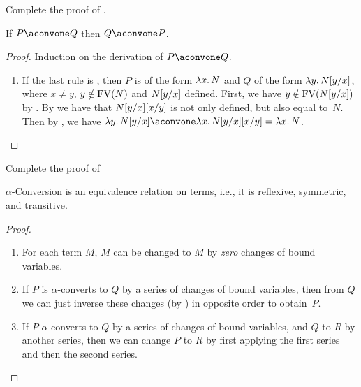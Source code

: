 \documentclass[../../../include/open-logic-section]{subfiles}
\begin{document}
\begin{prob}
  Complete the proof of .
\end{prob}

\begin{lem}
  If $P \aconvone Q$ then $Q \aconvone P$.
\end{lem}

\begin{proof}
  Induction on the derivation of $P \aconvone Q$.
  \begin{enumerate}
  \item If the last rule is , then $P$ is of the
    form $\lambd[x][N]$ and $Q$ of the form
    $\lambd[y][\Subst{N}{y}{x}]$, where $x \neq y$, $y \notin \mathrm{FV}({N})$
    and $N[y/x]$ defined. First, we have $y \notin
    \mathrm{FV}({N[y/x]})$ by . By
     we have that $N[y/x][x/y]$ is
    not only defined, but also equal to~$N$. Then by
    , we have $\lambd[y][\Subst{N}{y}{x}]
    \aconvone \lambd[x][\Subst{\Subst{N}{y}{x}}{x}{y}] =
    \lambd[x][N]$.
  \end{enumerate}
\end{proof}

\begin{prob}
  Complete the proof of 
\end{prob}

\begin{thm}
  $\alpha$-Conversion is an equivalence relation on terms, i.e., it is
  reflexive, symmetric, and transitive.
\end{thm}

\begin{proof}
  \begin{enumerate}
  \item For each term $M$, $M$ can be changed to $M$ by
    \emph{zero} changes of bound variables.
  \item If $P$ is $\alpha$-converts to $Q$ by a series of changes
    of bound variables, then from $Q$ we can just inverse these
    changes (by ) in
    opposite order to obtain~$P$.
  \item If $P$ $\alpha$-converts to $Q$ by a series of changes of
    bound variables, and $Q$ to $R$ by another series, then we can
    change $P$ to $R$ by first applying the first series and then the
    second series.
  \end{enumerate}
\end{proof}
\end{document}

